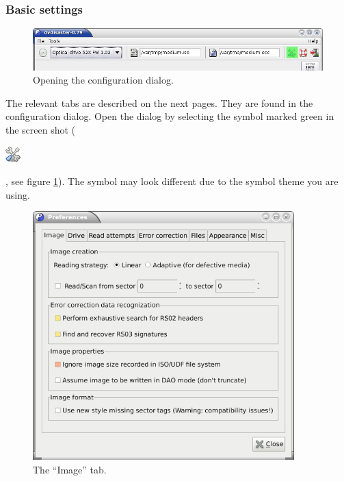 \subsubsection{Basic settings}
\label{howto-scan-basic-settings}

\begin{figure}[h]
\centerline{\includegraphics[width=\textwidth]{screenshots/global-prefs-invoke.png}}
\caption{Opening the configuration dialog.}  
\label{howto-scan-open-preferences}
\end{figure}

The relevant tabs are described on the next pages. They are
found in the configuration dialog.
Open the dialog by selecting the symbol marked green in the
screen shot ( \begin{minipage}{8mm}\includegraphics{icons/prefs-icon.png}\end{minipage}, see figure \ref{howto-scan-open-preferences}).
The symbol may look different due to the symbol theme you are using.

\newpage

\begin{figure}[h]
\centerline{\includegraphics[width=0.9\textwidth]{screenshots/scan-prefs-image.png}}
\caption{The ``Image'' tab.}  
\label{howto-scan-prefs-image}
\end{figure}

